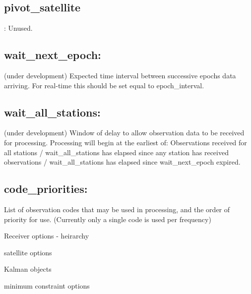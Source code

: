 \subsection{pivot\_satellite}:
Unused.
\subsection{wait\_next\_epoch:}
(under development)
Expected time interval between successive epochs data arriving. For real-time this should be set equal to epoch\_interval.
\subsection{wait\_all\_stations:}
(under development)
Window of delay to allow observation data to be received for processing.
Processing will begin at the earliest of: Observations received for all stations / wait\_all\_stations has elapsed since any station has received observations / wait\_all\_stations has elapsed since wait\_next\_epoch expired.

\subsection{code\_priorities:}
List of observation codes that may be used in processing, and the order of priority for use. (Currently only a single code is used per frequency)





Receiver options - heirarchy


satellite options


Kalman objects


minimum constraint options

